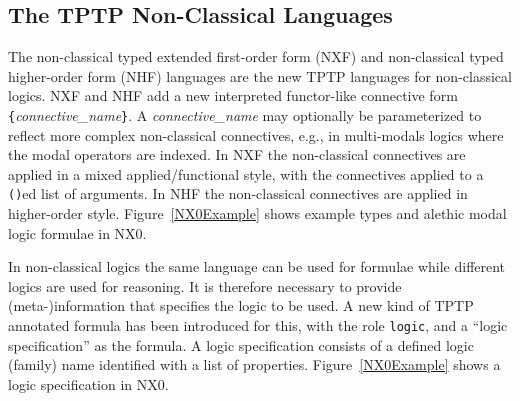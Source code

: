 \documentclass[runningheads]{llncs}
\begin{document}
\subsection{The TPTP Non-Classical Languages}
\label{NTFLanguages}

The non-classical typed extended first-order form (NXF) and non-classical typed higher-order 
form (NHF) languages are the new TPTP languages for non-classical logics.
NXF and NHF add a new interpreted functor-like connective form
{\tt \verb|{|}{\em connective\_name}{\tt \verb|}|}.
A {\em connective\_name} may optionally be parameterized to reflect more complex 
non-classical connectives, e.g., in multi-modals logics where the modal operators are indexed.
In NXF the non-classical connectives are applied in a mixed applied/functional style, with the 
connectives applied to a {\tt ()}ed list of arguments.
In NHF the non-classical connectives are applied in higher-order style.
Figure~\ref{NX0Example} shows example types and alethic modal logic formulae in NX0.
%
%
%         

In non-classical logics the same language can be used for formulae while different logics are 
used for reasoning.
It is therefore necessary to provide \mbox{(meta-)}information that specifies the
logic to be used.
A new kind of TPTP annotated formula has been introduced for this, with the role \texttt{logic},
and a ``logic specification'' as the formula.
A logic specification consists of a defined logic (family) name identified with a list of 
properties.
Figure~\ref{NX0Example} shows a logic specification in NX0.
\end{document}
